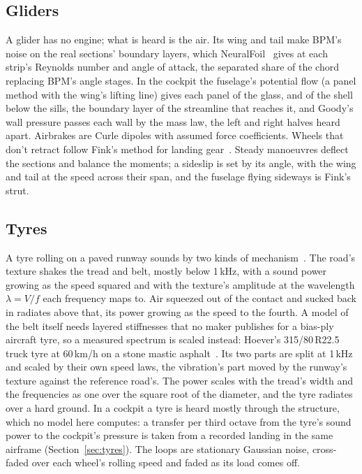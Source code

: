 \documentclass[10pt,a4paper,twocolumn]{article}
\begin{document}
\subsection{Gliders}
A glider has no engine; what is heard is the air. Its wing and tail make BPM's noise on the real sections' boundary layers, which NeuralFoil~\cite{neuralfoil} gives at each strip's Reynolds number and angle of attack, the separated share of the chord replacing BPM's angle stages. In the cockpit the fuselage's potential flow (a panel method with the wing's lifting line) gives each panel of the glass, and of the shell below the sills, the boundary layer of the streamline that reaches it, and Goody's wall pressure passes each wall by the mass law, the left and right halves heard apart. Airbrakes are Curle dipoles with assumed force coefficients. Wheels that don't retract follow Fink's method for landing gear~\cite{anopp}. Steady manoeuvres deflect the sections and balance the moments; a sideslip is set by its angle, with the wing and tail at the speed across their span, and the fuselage flying sideways is Fink's strut.

\subsection{Tyres}
A tyre rolling on a paved runway sounds by two kinds of mechanism~\cite{hoever,winroth}. The road's texture shakes the tread and belt, mostly below 1\,kHz, with a sound power growing as the speed squared and with the texture's amplitude at the wavelength $\lambda=V/f$ each frequency maps to. Air squeezed out of the contact and sucked back in radiates above that, its power growing as the speed to the fourth. A model of the belt itself needs layered stiffnesses that no maker publishes for a bias-ply aircraft tyre, so a measured spectrum is scaled instead: Hoever's 315/80\,R22.5 truck tyre at 60\,km/h on a stone mastic asphalt~\cite{hoever}. Its two parts are split at 1\,kHz and scaled by their own speed laws, the vibration's part moved by the runway's texture against the reference road's. The power scales with the tread's width and the frequencies as one over the square root of the diameter, and the tyre radiates over a hard ground. In a cockpit a tyre is heard mostly through the structure, which no model here computes: a transfer per third octave from the tyre's sound power to the cockpit's pressure is taken from a recorded landing in the same airframe (Section~\ref{sec:tyres}). The loops are stationary Gaussian noise, cross-faded over each wheel's rolling speed and faded as its load comes off.
\end{document}
